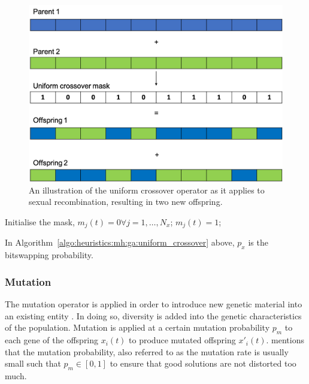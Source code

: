 \begin{figure}[htbp]
      \includegraphics[width=\textwidth]{images/uniform_crossover.png}
      \caption{An illustration of the uniform crossover operator as it applies to sexual recombination, resulting in two new offspring.}
      \label{fig:heuristics:mh:ga:uniform_crossover}
\end{figure}


\begin{algorithm}[H]
      \caption{The pseudo code for the uniform crossover operator as used by \acp{GA}.}
      \label{algo:heuristics:mh:ga:uniform_crossover}
      \begin{algorithmic}
            \State Initialise the mask, $m_{j}(t) = 0 \forall j = 1, \dots, N_{x}$;
            \State $m_{j}(t) = 1$;
            \EndIf
            \EndFor
            \State
      \end{algorithmic}
\end{algorithm}

In Algorithm~\ref{algo:heuristics:mh:ga:uniform_crossover} above, $p_{x}$ is the bitswapping probability.


\subsubsection{Mutation}
\label{sec:heuristics:mh:ga:mutation}

The mutation operator is applied in order to introduce new genetic material into an existing entity \cite{ref:engelbrecht:2007}. In doing so, diversity is added into the genetic characteristics of the population. Mutation is applied at a certain mutation probability $p_{m}$ to each gene of the offspring $x_{i}(t)$ to produce mutated offspring $x'_{i}(t)$. \citeauthor{ref:engelbrecht:2007}\cite{ref:engelbrecht:2007} mentions that the mutation probability, also referred to as the mutation rate is usually small such that $p_{m} \in [0,1]$ to ensure that good solutions are not distorted too much.

